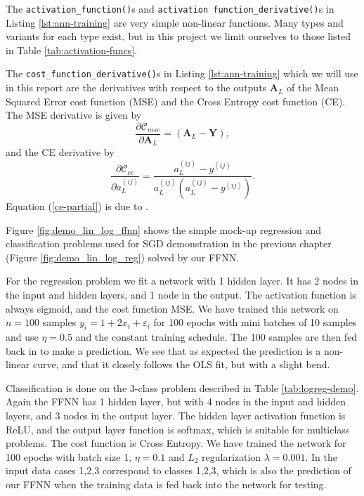 \documentclass[]{article}
\begin{document}
\vspace{5mm}

The \lstinline|activation_function()|s and \lstinline|activation function_derivative()|s in Listing \ref{lst:ann-training} are very simple non-linear functions. Many types and variants for each type exist, but in this project we limit ourselves to those listed in Table \ref{tab:activation-funcs}.


The \lstinline|cost_function_derivative()|s in Listing \ref{lst:ann-training} which we will use in this report are the derivatives with respect to the outputs $\mathbf{A}_L$ of the Mean Squared Error cost function (MSE) and the Cross Entropy cost function (CE). The MSE derivative is given by
\begin{equation}
	\frac{\partial \mathcal{C}_{mse}}{\partial \mathbf{A}_L} = (\mathbf{A}_L - \mathbf{Y}),
\end{equation}
and the CE derivative by
\begin{equation} \label{ce-partial}
	\frac{\partial \mathcal{C}_{ce}}{\partial a_L^{(ij)}} = \frac{a_L^{(ij)} - y^{(ij)}}{a_L^{(ij)} (a_L^{(ij)} - y^{(ij)})}.
\end{equation}
Equation (\ref{ce-partial}) is due to \cite{fys-stk4155-notes}.

\vspace{5mm}

Figure \ref{fig:demo_lin_log_ffnn} shows the simple mock-up regression and classification problems used for SGD demonstration in the previous chapter (Figure \ref{fig:demo_lin_log_reg}) solved by our FFNN.

For the regression problem we fit a network with 1 hidden layer. It has 2 nodes in the input and hidden layers, and 1 node in the output. The activation function is always sigmoid, and the cost function MSE. We have trained this network on $n = 100$ samples $y_i = 1 + 2x_i + \varepsilon_i$ for 100 epochs with mini batches of 10 samples and use $\eta = 0.5$ and the constant training schedule. The 100 samples are then fed back in to make a prediction. We see that as expected the prediction is a non-linear curve, and that it closely follows the OLS fit, but with a slight bend.

Classification is done on the 3-class problem described in Table \ref{tab:logreg-demo}. Again the FFNN has 1 hidden layer, but with 4 nodes in the input and hidden layers, and 3 nodes in the output layer. The hidden layer activation function is ReLU, and the output layer function is softmax, which is suitable for multiclass problems. The cost function is Cross Entropy. We have trained the network for 100 epochs with batch size 1, $\eta = 0.1$ and $L_2$ regularization $\lambda = 0.001$. In the input data cases 1,2,3 correspond to classes 1,2,3, which is also the prediction of our FFNN when the training data is fed back into the network for testing.
\end{document}
